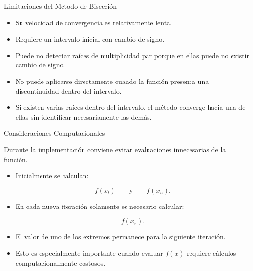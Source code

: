 \documentclass[../../main.tex]{subfiles}
\begin{document}

\begin{frame}{Limitaciones del Método de Bisección}

\begin{itemize}

    \item Su velocidad de convergencia es relativamente lenta.

    \item Requiere un intervalo inicial con cambio de signo.

    \item Puede no detectar raíces de multiplicidad par porque en ellas puede no existir cambio de signo.

    \item No puede aplicarse directamente cuando la función presenta una discontinuidad dentro del intervalo.

    \item Si existen varias raíces dentro del intervalo, el método converge hacia una de ellas sin identificar necesariamente las demás.

\end{itemize}

\end{frame}



\begin{frame}{Consideraciones Computacionales}

Durante la implementación conviene evitar evaluaciones innecesarias de la función.

\begin{itemize}

    \item Inicialmente se calculan:

    \[
    f(x_l)
    \qquad\text{y}\qquad
    f(x_u).
    \]

    \item En cada nueva iteración solamente es necesario calcular:

    \[
    f(x_r).
    \]

    \item El valor de uno de los extremos permanece para la siguiente iteración.

    \item Esto es especialmente importante cuando evaluar \(f(x)\) requiere cálculos computacionalmente costosos.

\end{itemize}

\end{frame}
\end{document}
